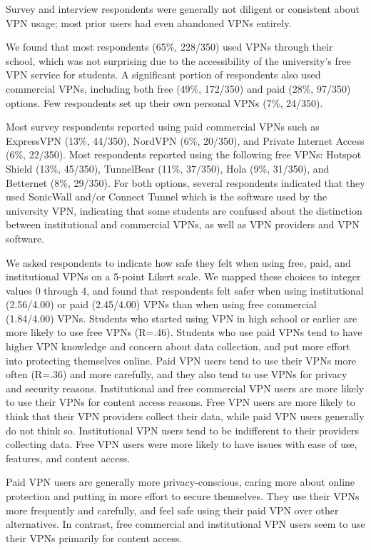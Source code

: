 Survey and interview respondents were generally not diligent or consistent about VPN usage; most prior users had even abandoned VPNs entirely.


We found that most respondents (65\%, 228/350) used VPNs through their school,
which was not surprising due to the accessibility of the university’s free VPN
service for students. A significant portion of respondents also used
commercial VPNs, including both free (49\%, 172/350) and paid (28\%, 97/350)
options. Few respondents set up their own personal VPNs (7\%, 24/350).

Most survey respondents reported using paid commercial VPNs such as 
ExpressVPN (13\%, 44/350), NordVPN (6\%, 20/350), and Private Internet
Access (6\%, 22/350). Most respondents reported using the following free VPNs: Hotspot Shield (13\%, 45/350), TunnelBear
(11\%, 37/350), Hola (9\%, 31/350), and Betternet (8\%, 29/350). For both
options, several respondents indicated that they used SonicWall and/or Connect
Tunnel which is the software used by the university VPN, indicating that some
students are confused about the distinction between institutional and
commercial VPNs, as well as VPN providers and VPN software.

We asked respondents to indicate how safe they felt when using free, paid, and
institutional VPNs on a 5-point Likert scale. We mapped these choices to
integer values 0 through 4, and found that respondents felt safer when using
institutional (2.56/4.00) or paid (2.45/4.00) VPNs than when using free
commercial (1.84/4.00) VPNs. Students who started using VPN in high school or
earlier are more likely to use free VPNs (R=.46). Students who use paid VPNs
tend to have higher VPN knowledge and concern about data collection, and put
more effort into protecting themselves online. Paid VPN users tend to use
their VPNs more often (R=.36) and more carefully, and they also tend to use
VPNs for privacy and security reasons. Institutional and free commercial VPN
users are more likely to use their VPNs for content access reasons. Free VPN
users are more likely to think that their VPN providers collect their data,
while paid VPN users generally do not think so. Institutional VPN users tend
to be indifferent to their providers collecting data. Free VPN users were more
likely to have issues with ease of use, features, and content access.

Paid VPN users are generally more privacy-conscious, caring more about online
protection and putting in more effort to secure themselves. They use their
VPNs more frequently and carefully, and feel safe using their paid VPN over
other alternatives. In contrast, free commercial and institutional VPN users
seem to use their VPNs primarily for content access.






